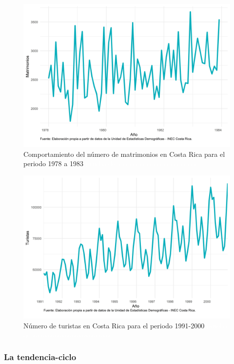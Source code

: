 \documentclass[
]{article}
\begin{document}
\begin{figure}[H]
\includegraphics[width=1\linewidth,height=1\textheight]{Tesis_files/figure-latex/ejemplo_aditiva-1} \caption{Comportamiento del número de matrimonios en Costa Rica para el periodo 1978 a 1983 \textcolor{white}{prueba de aaaaaaaaaaaaaaaaaaaaaaa}}\label{fig:ejemplo_aditiva}
\end{figure}

\begin{figure}[H]
\includegraphics[width=1\linewidth,height=1\textheight]{Tesis_files/figure-latex/ejemplo_multiplicativa-1} \caption{Número de turistas en Costa Rica para el periodo 1991-2000 \textcolor{white}{prueba de aaaaaaaaaaaaaaaaaaaaaaa}}\label{fig:ejemplo_multiplicativa}
\end{figure}

\subsubsection{La tendencia-ciclo}
\end{document}

